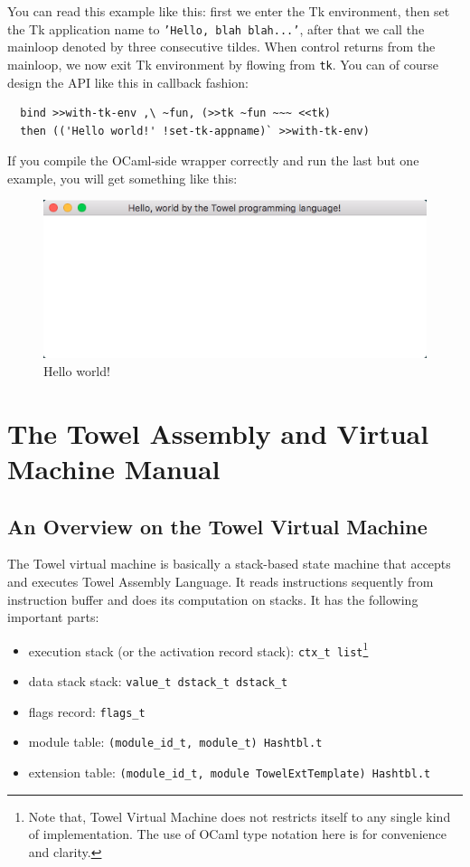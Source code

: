 \documentclass{report}
\begin{document}
You can read this example like this: first we enter the Tk environment, then set the Tk application name to \texttt{'Hello, blah blah...'}, after that we call the mainloop denoted by three consecutive tildes. When control returns from the mainloop, we now exit Tk environment by flowing from \texttt{tk}. You can of course design the API like this in callback fashion:

\begin{mdframed}[style=example]
\begin{verbatim}
  bind >>with-tk-env ,\ ~fun, (>>tk ~fun ~~~ <<tk)
  then (('Hello world!' !set-tk-appname)` >>with-tk-env)
\end{verbatim}
\end{mdframed}

If you compile the OCaml-side wrapper correctly and run the last but one example, you will get something like this:

\begin{figure}[H]
  \centering
  \includegraphics[scale=0.75]{fig-gui.png}
  \caption{Hello world!}
  \label{fig:gui}
\end{figure}

\part{The Towel Assembly and Virtual Machine Manual}

\chapter{An Overview on the Towel Virtual Machine}

The Towel virtual machine is basically a stack-based state machine that accepts and executes Towel Assembly Language. It reads instructions sequently from instruction buffer and does its computation on stacks. It has the following important parts:
\begin{itemize}
\item execution stack (or the activation record stack): \texttt{ctx\_t list}\footnote{Note that, Towel Virtual Machine does not restricts itself to any single kind of implementation. The use of OCaml type notation here is for convenience and clarity.}
\item data stack stack: \texttt{value\_t dstack\_t dstack\_t}
\item flags record: \texttt{flags\_t}
\item module table: \texttt{(module\_id\_t, module\_t) Hashtbl.t}
\item extension table: \texttt{(module\_id\_t, module TowelExtTemplate) Hashtbl.t}
\end{itemize}
\end{document}
